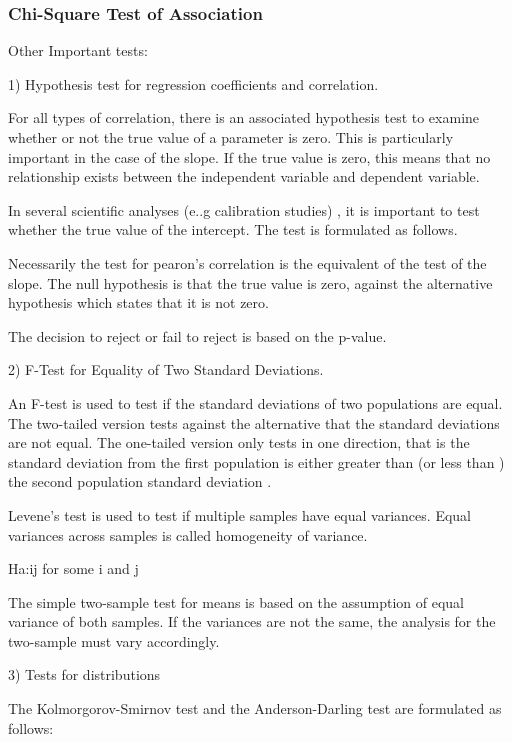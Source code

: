 \begin{frame}
\frametitle{Chi-Square Test of Association}

\Large
Other Important tests: 
 
1) Hypothesis test for regression coefficients and correlation.
 
For all types of correlation, there is an associated hypothesis test to examine whether or not the true value of a parameter is zero. This is particularly important in the case of the slope. If the true value is zero, this means that no relationship exists between the independent variable and dependent variable.
 
    
 
In several scientific analyses (e..g calibration studies) , it is important to test whether the true value of the intercept. The test is formulated as follows. 
 
    
 
Necessarily the test for pearon's correlation is the equivalent of the test of the slope. The null hypothesis is that the true value is zero, against the alternative hypothesis which states that it is not zero.
 
    
 
The decision to reject or fail to reject is based on the p-value. 
 
 
2)  F-Test for Equality of Two Standard Deviations.
 
An F-test is used to test if the standard deviations of two populations are equal. 
The two-tailed version tests against the alternative that the standard deviations are not equal. The one-tailed version only tests in one direction, that is the standard deviation from the first population is either greater than (or less than ) the second population standard deviation .
 
 
 
Levene's test is used to test if multiple samples have equal variances. Equal variances across samples is called homogeneity of variance.
 

 
Ha:ij  for some i and j
 
The simple two-sample test for means  is based on the assumption of equal variance of both samples. If the variances are not the same, the analysis for the two-sample must vary accordingly.
 
 
3) Tests for distributions
 
The Kolmorgorov-Smirnov test and the Anderson-Darling test are formulated as follows:
 

\end{frame}

